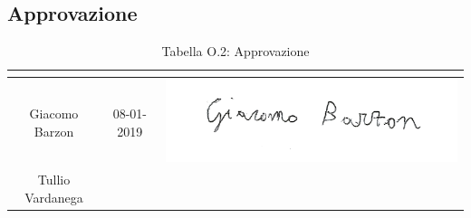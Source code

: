 \subsection{Approvazione}
\renewcommand{\arraystretch}{2}
\begin{table}[H]
\begin{center}
  \begin{tabular}{| c | c | c |}
    \hline
    \rowcolor{title_row}
    \textbf{\color{title_text}{Nominativo}} & \textbf{\color{title_text}{Data}} & \textbf{\color{title_text}{Firma}} \\ \hline
    Giacomo Barzon & 08-01-2019 & \includegraphics[align=c,scale=1]{Res/Firme/giacomo.png} \\ \hline
    Tullio Vardanega &  &  \\
    \hline
  \end{tabular}
  \caption{Tabella O.2: Approvazione\label{}}
\end{center}
\end{table}
\renewcommand{\arraystretch}{1}

